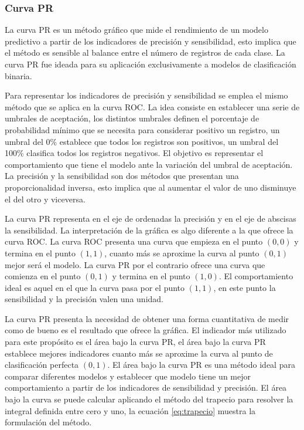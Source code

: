 \subsubsection{Curva PR}

La curva PR es un método gráfico que mide el rendimiento de un modelo predictivo a partir de los indicadores de precisión y sensibilidad, esto implica que el método es sensible al balance entre el número de registros de cada clase. La curva PR fue ideada para su aplicación exclusivamente a modelos de clasificación binaria.

\bigbreak

Para representar los indicadores de precisión y sensibilidad se emplea el mismo método que se aplica en la curva ROC. La idea consiste en establecer una serie de umbrales de aceptación, los distintos umbrales definen el porcentaje de probabilidad mínimo que se necesita para considerar positivo un registro, un umbral del 0\% establece que todos los registros son positivos, un umbral del 100\% clasifica todos los registros negativos. El objetivo es representar el comportamiento que tiene el modelo ante la variación del umbral de aceptación. La precisión y la sensibilidad son dos métodos que presentan una proporcionalidad inversa, esto implica que al aumentar el valor de uno disminuye el del otro y viceversa.  

\bigbreak

La curva PR representa en el eje de ordenadas la precisión y en el eje de abscisas la sensibilidad. La interpretación de la gráfica es algo diferente a la que ofrece la curva ROC. La curva ROC presenta una curva que empieza en el punto $(0, 0)$ y termina en el punto $(1, 1)$, cuanto más se aproxime la curva al punto $(0, 1)$ mejor será el modelo. La curva PR por el contrario ofrece una curva que comienza en el punto $(0, 1)$ y termina en el punto $(1, 0)$. El comportamiento ideal es aquel en el que la curva pasa por el punto $(1, 1)$, en este punto la sensibilidad y la precisión valen una unidad.

\bigbreak

La curva PR presenta la necesidad de obtener una forma cuantitativa de medir como de bueno es el resultado que ofrece la gráfica. El indicador más utilizado para este propósito es el área bajo la curva PR, el área bajo la curva PR establece mejores indicadores cuanto más se aproxime la curva al punto de clasificación perfecta $(0, 1)$. El área bajo la curva PR es una método ideal para comparar diferentes modelos y establecer que modelo tiene un mejor comportamiento a partir de los indicadores de sensibilidad y precisión. El área bajo la curva se puede calcular aplicando el método del trapecio para resolver la integral definida entre cero y uno, la ecuación \ref{eq:trapecio} muestra la formulación del método.

